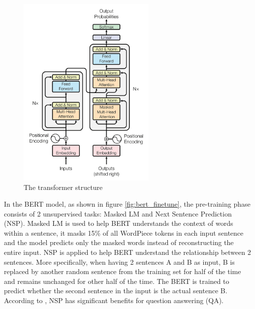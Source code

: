 \documentclass[runningheads]{llncs}
\begin{document}
  \begin{figure}[htbp]
      \centering
      \includegraphics[width=0.6\textwidth]{attention1.jpg}
      \caption{The transformer structure \cite{Vaswani17}}
      \label{fig:attention}
  \end{figure}
In the BERT model, as shown in figure \ref{fig:bert_finetune}, the pre-training phase consists of 2 unsupervised tasks: Masked LM and Next Sentence Prediction (NSP).
Masked LM is used to help BERT understands the context of words within a sentence, it masks 15\% of all WordPiece tokens in each input sentence and the model 
predicts only the masked words instead of reconstructing the entire input. NSP is applied to help BERT understand the relationship between 2 sentences. More specifically, when 
having 2 sentences A and B as input, B is replaced by another random sentence from the training set for half of the time and remains unchanged for other half of the time.
The BERT is trained to predict whether the second sentence in the input is the actual sentence B. According to \cite{Devlin18}, NSP has significant benefits for question answering (QA).
\end{document}

